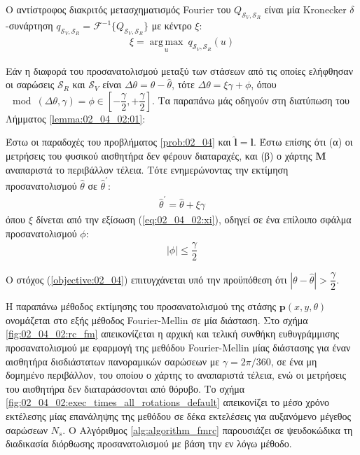 Ο αντίστροφος διακριτός μετασχηματισμός Fourier του
$Q_{\mathcal{S}_V, \mathcal{S}_R}$ είναι μία Kronecker $\delta$-συνάρτηση
$q_{\mathcal{S}_V, \mathcal{S}_R} = \mathcal{F}^{-1}\{Q_{\mathcal{S}_V, \mathcal{S}_R}\}$
με κέντρο $\xi$:
\begin{align}
  \xi = \operatorname*{arg\,max}\limits_u \ q_{\mathcal{S}_V, \mathcal{S}_R}(u)
  \label{eq:02_04_02:xi}
\end{align}

Εάν η διαφορά του προσανατολισμού μεταξύ των στάσεων από τις οποίες ελήφθησαν
οι σαρώσεις $\mathcal{S}_R$ και $\mathcal{S}_V$ είναι
$\Delta\theta = \theta - \hat{\theta}$, τότε
$\Delta\theta = \xi\gamma + \phi$, όπου
$\mod(\Delta\theta, \gamma) = \phi \in [-\dfrac{\gamma}{2},+\dfrac{\gamma}{2}]$.
Τα παραπάνω μάς οδηγούν στη διατύπωση του Λήμματος \ref{lemma:02_04_02:01}:

\begin{lemma}
  Έστω οι παραδοχές του προβλήματος \ref{prob:02_04} και $\hat{\bm{l}} = \bm{l}$.
  Έστω επίσης ότι (α) οι μετρήσεις του φυσικού αισθητήρα δεν φέρουν
  διαταραχές, και (β) ο χάρτης $\bm{M}$ αναπαριστά το περιβάλλον τέλεια.
  Τότε ενημερώνοντας την εκτίμηση προσανατολισμού $\hat{\theta}$ σε
  $\hat{\theta}^\prime$:
  \begin{align}
    \hat{\theta}^\prime = \hat{\theta} + \xi \gamma \label{eq:update_t1}
  \end{align}
  όπου $\xi$ δίνεται από την εξίσωση (\ref{eq:02_04_02:xi}),
  οδηγεί σε ένα επίλοιπο σφάλμα προσανατολισμού $\phi$:
  \begin{align}
    |\phi| \leq \dfrac{\gamma}{2}  \label{eq:phi_1}
  \end{align}
  \label{lemma:02_04_02:01}
\end{lemma}

\begin{corollary}
  Ο στόχος (\ref{objective:02_04}) επιτυγχάνεται υπό την προϋπόθεση ότι
  $|\theta-\hat{\theta}| > \dfrac{\gamma}{2}$.
\end{corollary}

Η παραπάνω μέθοδος εκτίμησης του προσανατολισμού της στάσης
$\bm{p}(x,y,\theta)$ ονομάζεται στο εξής μέθοδος Fourier-Mellin σε μία
διάσταση. Στο σχήμα \ref{fig:02_04_02:rc_fm} απεικονίζεται η αρχική και τελική
συνθήκη ευθυγράμμισης προσανατολισμού με εφαρμογή της μεθόδου Fourier-Mellin
μίας διάστασης για έναν αισθητήρα δισδιάστατων πανοραμικών σαρώσεων με $\gamma
= 2\pi/360$, σε ένα μη δομημένο περιβάλλον, του οποίου ο χάρτης το αναπαριστά
τέλεια, ενώ οι μετρήσεις του αισθητήρα δεν διαταράσσονται από θόρυβο. Το σχήμα
\ref{fig:02_04_02:exec_times_all_rotations_default} απεικονίζει το μέσο χρόνο
εκτέλεσης μίας επανάληψης της μεθόδου σε δέκα εκτελέσεις για αυξανόμενο μέγεθος
σαρώσεων $N_s$.  Ο Αλγόριθμος \ref{alg:algorithm_fmrc} παρουσιάζει σε
ψευδοκώδικα τη διαδικασία διόρθωσης προσανατολισμού με βάση την εν λόγω μέθοδο.

